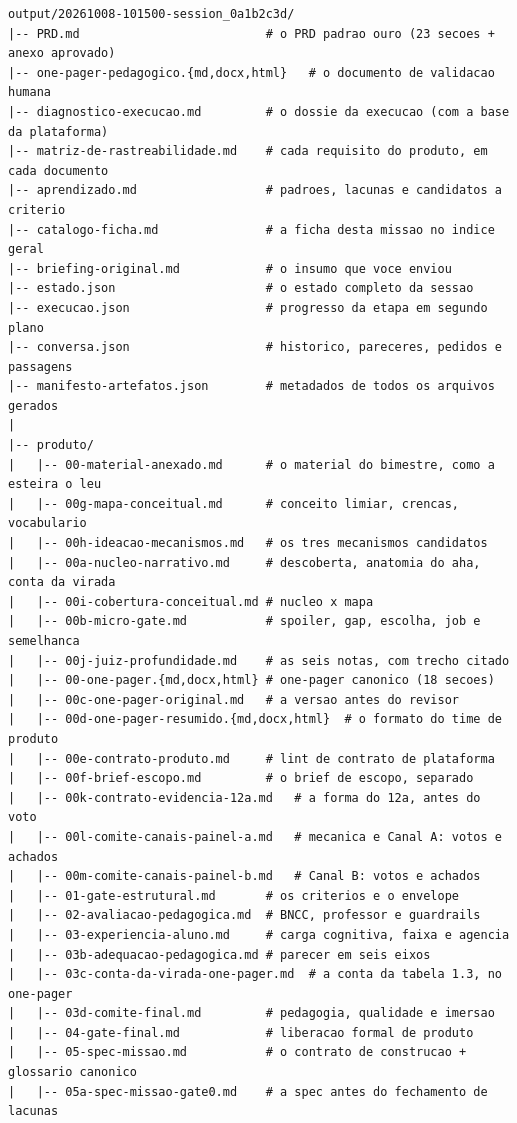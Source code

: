 \documentclass[11pt,a4paper]{article}
\begin{document}
\begin{lstlisting}
output/20261008-101500-session_0a1b2c3d/
|-- PRD.md                          # o PRD padrao ouro (23 secoes + anexo aprovado)
|-- one-pager-pedagogico.{md,docx,html}   # o documento de validacao humana
|-- diagnostico-execucao.md         # o dossie da execucao (com a base da plataforma)
|-- matriz-de-rastreabilidade.md    # cada requisito do produto, em cada documento
|-- aprendizado.md                  # padroes, lacunas e candidatos a criterio
|-- catalogo-ficha.md               # a ficha desta missao no indice geral
|-- briefing-original.md            # o insumo que voce enviou
|-- estado.json                     # o estado completo da sessao
|-- execucao.json                   # progresso da etapa em segundo plano
|-- conversa.json                   # historico, pareceres, pedidos e passagens
|-- manifesto-artefatos.json        # metadados de todos os arquivos gerados
|
|-- produto/
|   |-- 00-material-anexado.md      # o material do bimestre, como a esteira o leu
|   |-- 00g-mapa-conceitual.md      # conceito limiar, crencas, vocabulario
|   |-- 00h-ideacao-mecanismos.md   # os tres mecanismos candidatos
|   |-- 00a-nucleo-narrativo.md     # descoberta, anatomia do aha, conta da virada
|   |-- 00i-cobertura-conceitual.md # nucleo x mapa
|   |-- 00b-micro-gate.md           # spoiler, gap, escolha, job e semelhanca
|   |-- 00j-juiz-profundidade.md    # as seis notas, com trecho citado
|   |-- 00-one-pager.{md,docx,html} # one-pager canonico (18 secoes)
|   |-- 00c-one-pager-original.md   # a versao antes do revisor
|   |-- 00d-one-pager-resumido.{md,docx,html}  # o formato do time de produto
|   |-- 00e-contrato-produto.md     # lint de contrato de plataforma
|   |-- 00f-brief-escopo.md         # o brief de escopo, separado
|   |-- 00k-contrato-evidencia-12a.md   # a forma do 12a, antes do voto
|   |-- 00l-comite-canais-painel-a.md   # mecanica e Canal A: votos e achados
|   |-- 00m-comite-canais-painel-b.md   # Canal B: votos e achados
|   |-- 01-gate-estrutural.md       # os criterios e o envelope
|   |-- 02-avaliacao-pedagogica.md  # BNCC, professor e guardrails
|   |-- 03-experiencia-aluno.md     # carga cognitiva, faixa e agencia
|   |-- 03b-adequacao-pedagogica.md # parecer em seis eixos
|   |-- 03c-conta-da-virada-one-pager.md  # a conta da tabela 1.3, no one-pager
|   |-- 03d-comite-final.md         # pedagogia, qualidade e imersao
|   |-- 04-gate-final.md            # liberacao formal de produto
|   |-- 05-spec-missao.md           # o contrato de construcao + glossario canonico
|   |-- 05a-spec-missao-gate0.md    # a spec antes do fechamento de lacunas

\end{lstlisting}
\end{document}
